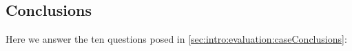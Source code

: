 

%
\subsection{Conclusions}

 Here we answer the ten questions posed in
 \autoref{sec:intro:evaluation:caseConclusions}:

